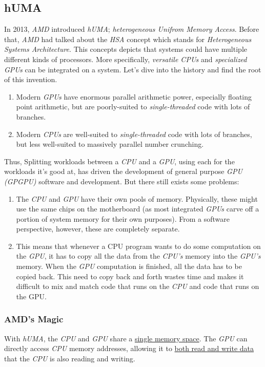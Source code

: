 \documentclass[12pt]{article}
\numberwithin{equation}{section}
\numberwithin{table}{section}
\numberwithin{figure}{section}
\begin{document}
\subsection*{hUMA}
In 2013, \textit{AMD} introduced \textit{hUMA}; \textit{heterogeneous Unifrom Memory Access}. Before that, \textit{AMD} had talked about the \textit{HSA} concept which stands for \textit{Heterogeneous Systems Architecture}. This concepts depicts that systems could have multiple different kinds of processors. More specifically, \textit{versatile CPUs} and \textit{specialized GPUs} can be integrated on a system. Let's dive into the history and find the root of this invention.
\begin{enumerate}
	\item	Modern \textit{GPUs} have enormous parallel arithmetic power, especially floating point arithmetic, but are poorly-suited to \textit{single-threaded} code with lots of branches.
	\item Modern \textit{CPUs} are well-suited to \textit{single-threaded} code with lots of branches, but less well-suited to massively parallel number crunching.
\end{enumerate}
Thus, Splitting workloads between a \textit{CPU} and a \textit{GPU}, using each for the workloads it's good at, has driven the development of general purpose \textit{GPU (GPGPU)} software and development.\newpage
But there still exists some problems:
\begin{enumerate}
	\item The \textit{CPU} and \textit{GPU} have their own pools of memory. Physically, these might use the same chips on the motherboard (as most integrated \textit{GPUs} carve off a portion of system memory for their own purposes). From a software perspective, however, these are completely separate.
	\item This means that whenever a CPU program wants to do some computation on the \textit{GPU}, it has to copy all the data from the \textit{CPU's} memory into the \textit{GPU's} memory. When the \textit{GPU} computation is finished, all the data has to be copied back. This need to copy back and forth wastes time and makes it difficult to mix and match code that runs on the \textit{CPU} and code that runs on the GPU.
\end{enumerate}
\subsubsection*{AMD's Magic}
With \textit{hUMA}, the \textit{CPU} and \textit{GPU} share a \underline{single memory space}. The \textit{GPU} can directly access \textit{CPU} memory addresses, allowing it to \underline{both read and write data} that the \textit{CPU} is also reading and writing.
\end{document}
